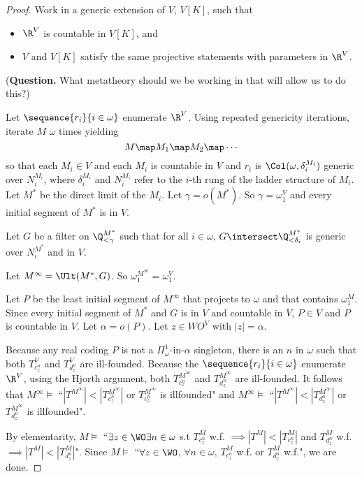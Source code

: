 \documentclass[oneside,12pt]{amsart}
\begin{document}
\begin{proof}
Work in a generic extension of $V$, $V[K]$,  such that
\begin{itemize}
\item $\R^V$ is countable in $V[K]$, and
\item $V$ and $V[K]$ satisfy the same projective statements with parameters
in $\R^{V}$.
\end{itemize}
(\textbf{Question.} What metatheory should we be working in that will allow
us to do this?)

Let $\sequence{r_i}{i\in\omega}$ enumerate $\R^V$.
Using repeated genericity iterations, iterate $M$ $\omega$ times yielding
$$M \map M_1 \map M_2 \map \cdots$$ so that each $M_i\in V$ and each $M_i$ is
countable in $V$ and $r_i$ is
$\Col(\omega,\delta_i^{M_i})$ generic over $N_i^{M_i}$, where $\delta_i^{M_i}$
and $N_i^{M_i}$ refer to the $i$-th rung of the ladder structure of $M_i$.
Let $M^*$ be the direct limit of the $M_i$. Let $\gamma = o(M^*)$.
So $\gamma=\omega_1^V$ and every initial segment of $M^*$ is in $V$.

Let $G$ be a filter on $\Q_{<\gamma}^{M^*}$ such that for all $i\in\omega$,
$G\intersect \Q_{<\delta_i}^{M^*}$ is generic over $N_i^{M^*}$ and in $V$.

Let $M^{\infty}= \Ult(M^*,G)$.
So $\omega_1^{M^{\infty}} = \omega_1^V$.

Let $P$ be the least initial segment of $M^{\infty}$ that projects to $\omega$
and that contains $\omega_1^M$. Since every initial segment of $M^*$ and $G$ is
in $V$ and countable in $V$,
$P\in V$ and $P$ is countable in $V$. Let $\alpha=o(P)$. Let $z\in WO^V$ with $|z|=\alpha$.

Because any real
coding $P$ is not a $\Pi^1_{\omega}$-in-$\alpha$ singleton, there is an $n$
in $\omega$ such that both $T^V_{c^n_z}$ and $T^V_{d^n_z}$ are ill-founded.
Because the $\sequence{r_i}{i\in\omega}$ enumerate $\R^V$, using the Hjorth
argument, both $T^{M^{\infty}}_{c^n_z}$ and $T^{M^{\infty}}_{d^n_z}$ are ill-founded. It follows that
$M^{\infty}\models$ ``$|T^{M^{\infty}}| < |T^{M^{\infty}}_{c^n_z}|$ or
$T^{M^{\infty}}_{c^n_z}$ is illfounded" and
$M^{\infty}\models$ ``$|T^{M^{\infty}}| < |T^{M^{\infty}}_{d^n_z}|$ or
$T^{M^{\infty}}_{d^n_z}$ is illfounded".

By elementarity, $M\models$ ``$\exists z \in \WO \exists n
\in \omega$ s.t  $T^M_{c^n_z}$ w.f. $\implies
|T^M| < |T^M_{c^n_z}|$ and $T^M_{d^n_z}$ w.f. $\implies
|T^M| < |T^M_{d^n_z}|$". Since $M\models$ ``$\forall z \in \WO$,
$\forall n \in \omega$, $T^M_{c^n_z}$ w.f.
or $T^M_{d^n_z}$ w.f.", we are done.

\end{proof}
\end{document}
